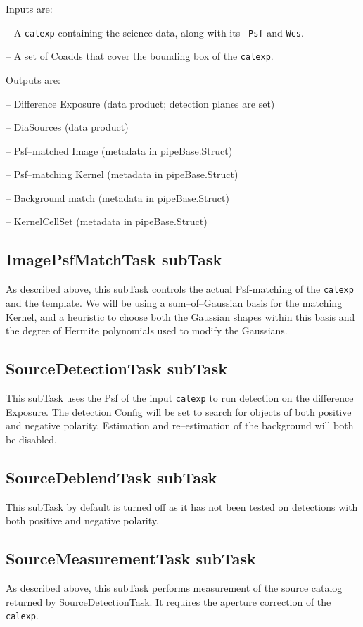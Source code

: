 \documentclass[prd, nofootinbib, floatfix, 11pt,tightenlines,times]{article}
\begin{document}
Inputs are:

-- A {\tt calexp} containing the science data, along with its {\tt
  Psf} and {\tt Wcs}.

-- A set of Coadds that cover the bounding box of the {\tt calexp}.

Outputs are:

-- Difference Exposure (data product; detection planes are set)

-- DiaSources (data product)

-- Psf--matched Image (metadata in pipeBase.Struct)

-- Psf--matching Kernel (metadata in pipeBase.Struct)

-- Background match (metadata in pipeBase.Struct)

-- KernelCellSet (metadata in pipeBase.Struct)

\subsection{ImagePsfMatchTask subTask}
As described above, this subTask controls the actual Psf-matching of
the {\tt calexp} and the template.  We will be using a
sum--of--Gaussian basis for the matching Kernel, and a heuristic to
choose both the Gaussian shapes within this basis and the degree of
Hermite polynomials used to modify the Gaussians.

\subsection{SourceDetectionTask subTask}
This subTask uses the Psf of the input {\tt calexp} to run detection
on the difference Exposure.  The detection Config will be set to
search for objects of both positive and negative polarity.  Estimation
and re--estimation of the background will both be disabled.

\subsection{SourceDeblendTask subTask}
This subTask by default is turned off as it has not been tested on detections
with both positive and negative polarity.

\subsection{SourceMeasurementTask subTask}
As described above, this subTask performs measurement of the source
catalog returned by SourceDetectionTask.  It requires the aperture
correction of the {\tt calexp}.
\end{document}
